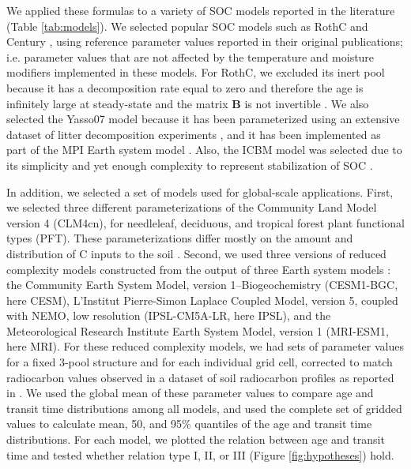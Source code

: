 \documentclass[draft,linenumbers]{agujournal}
\begin{document}
We applied these formulas to a variety of SOC models reported in the literature (Table \ref{tab:models}). We selected popular SOC models such as RothC and Century \citep{Jenkinson1990, Parton1987}, using reference parameter values reported in their original publications; i.e. parameter values that are not affected by the temperature and moisture modifiers implemented in these models. For RothC, we excluded its inert pool because it has a decomposition rate equal to zero and therefore the age is infinitely large at steady-state and the matrix $\mathbf{B}$ is not invertible \citep{Metzler2018MG}. 
We also selected the Yasso07 model because it has been parameterized using an extensive dataset of litter decomposition experiments \citep{Tuomi2009}, and it has been implemented as part of the MPI Earth system model \citep{Goll2015}. Also, the ICBM model was selected due to its simplicity and yet enough complexity to represent stabilization of SOC \citep{Andren1997}. 

In addition, we selected a set of models used for global-scale applications. First, we selected three different parameterizations of the Community Land Model version 4 (CLM4cn), for needleleaf, deciduous, and tropical forest plant functional types (PFT). These parameterizations differ mostly on the amount and distribution of C inputs to the soil \citep{Wieder2014}. Second, we used three versions of reduced complexity models constructed from the output of three Earth system models \citep{He2016}: the Community Earth System Model, version 1--Biogeochemistry (CESM1-BGC, here CESM), L'Institut Pierre-Simon Laplace Coupled Model, version 5, coupled with NEMO, low resolution (IPSL-CM5A-LR, here IPSL), and the Meteorological Research Institute Earth System Model, version 1 (MRI-ESM1, here MRI). For these reduced complexity models, we had sets of parameter values for a fixed 3-pool structure and for each individual grid cell, corrected to match radiocarbon values observed in a dataset of soil radiocarbon profiles as reported in \citet{He2016}. We used the global mean of these parameter values to compare age and transit time distributions among all models, and used the complete set of gridded values to calculate mean, 50, and 95\% quantiles of the age and transit time distributions. 
For each model, we plotted the relation between age and transit time and tested whether relation type I, II, or III (Figure \ref{fig:hypotheses}) hold. 
\end{document}
